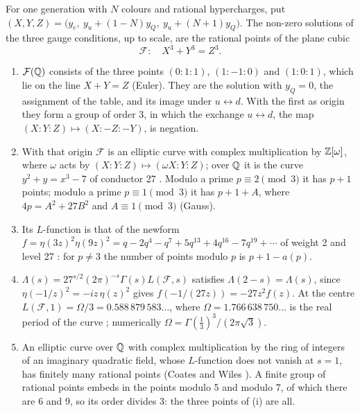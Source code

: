 \documentclass[11pt]{article}
\begin{document}
\begin{derivation}\label{d:curve}
For one generation with $N$ colours and rational hypercharges, put $(X,Y,Z) = \bigl(y_e,\ y_u+(1-N)y_Q,\ y_u+(N+1)y_Q\bigr)$.
The non-zero solutions of the three gauge conditions, up to scale, are the rational points of the plane cubic
\[
  \mathcal F:\quad X^3+Y^3=Z^3 .
\]
\begin{enumerate}[label=(\roman*)]
\item $\mathcal F(\mathbb{Q})$ consists of the three points $(0:1:1)$, $(1:-1:0)$ and $(1:0:1)$, which lie on the line $X+Y=Z$ (Euler).
They are the solution with $y_Q=0$, the assignment of the table, and its image under $u\leftrightarrow d$.
With the first as origin they form a group of order 3, in which the exchange $u\leftrightarrow d$, the map $(X:Y:Z)\mapsto(X:-Z:-Y)$, is negation.
\item With that origin $\mathcal F$ is an elliptic curve with complex multiplication by $\mathbb{Z}[\omega]$, where $\omega$ acts by $(X:Y:Z)\mapsto(\omega X:Y:Z)$; over $\mathbb{Q}$ it is the curve $y^2+y=x^3-7$ of conductor 27 \cite{LMFDB}.
Modulo a prime $p\equiv2\pmod3$ it has $p+1$ points; modulo a prime $p\equiv1\pmod3$ it has $p+1+A$, where $4p=A^2+27B^2$ and $A\equiv1\pmod3$ (Gauss).
\item Its $L$-function is that of the newform $f=\eta(3z)^2\eta(9z)^2 = q-2q^4-q^7+5q^{13}+4q^{16}-7q^{19}+\cdots$ of weight 2 and level 27 \cite{MartinOno}: for $p\ne3$ the number of points modulo $p$ is $p+1-a(p)$.
\item $\Lambda(s) = 27^{s/2}(2\pi)^{-s}\Gamma(s)L(\mathcal F,s)$ satisfies $\Lambda(2-s)=\Lambda(s)$, since $\eta(-1/z)^2 = -iz\,\eta(z)^2$ gives $f(-1/(27z)) = -27z^2f(z)$.
At the centre $L(\mathcal F,1) = \Omega/3 = 0.588\,879\,583\ldots$, where $\Omega = 1.766\,638\,750\ldots$ is the real period of the curve \cite{LMFDB}; numerically $\Omega = \Gamma(\tfrac13)^3/(2\pi\sqrt3)$.
\item An elliptic curve over $\mathbb{Q}$ with complex multiplication by the ring of integers of an imaginary quadratic field, whose $L$-function does not vanish at $s=1$, has finitely many rational points (Coates and Wiles \cite{CoatesWiles}).
A finite group of rational points embeds in the points modulo 5 and modulo 7, of which there are 6 and 9, so its order divides 3: the three points of (i) are all.
\end{enumerate}
\end{derivation}
\end{document}
